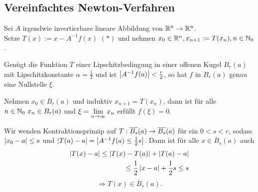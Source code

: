 \documentclass[../ana2.tex]{subfiles}
\begin{document}
\subsection*{Vereinfachtes Newton-Verfahren}
Sei \(A\) irgendwie invertierbare lineare Abbildung von 
\( \mathbb{R}^n \rightarrow \mathbb{R}^n \).\\
Setze \( T(x) := x - A^{-1} f(x) \) \((*)\) 
und nehmen \( x_0 \in \mathbb{R}^n, x_{n+1} := T(x_n), n\in \mathbb{N}_0 \).
\begin{satz}
    Genügt die Funktion \(T\) einer Lipschitzbedingung
    in einer offenen Kugel \( B_r(a) \) mit 
    Lipschitzkonstante \( \alpha = \frac{1}{2} \) 
    und ist \(\left|A^{-1} f(a)\right| < \frac{r}{2}\), so hat \(f\)
    in \(B_r(a)\) genau eine Nullstelle \(\xi\).
\end{satz}
Nehmen \( x_0 \in B_r(a) \) und induktiv 
\( x_{n+1} = T(x_n) \), dann ist für alle \( n \in \mathbb{N}_0 \ x_n \in B_r(a) \) 
und \( \xi = \lim\limits_{n\rightarrow\infty} x_n \) erfüllt \( f(\xi) = 0 \).
\begin{bew}
    Wir wenden Kontraktionsprinzip auf \( T:\overline{B_s}(a)\rightarrow \overline{B_s}(a) \) 
    für ein \( 0 < s < r \), sodass \( \left|x_0 - a\right| \leq s \) 
    und \( \left| T(a) - a \right| = \left| A^{-1} f(a) \leq \frac{1}{2}s \right| \).
    Dann ist für alle \(x \in \overline{B}_s(a)\) auch
    \begin{align*}
        \left|T(x)-a\right| \leq \left|T(x)-T(a)\right| + \left|T(a)-a\right|\\
        \leq \frac{1}{2} \left|x-a\right| + \frac{1}{2}s \leq s
    \end{align*}
    \[ \Rightarrow T(x) \in \overline{B}_s(a). \]
\end{bew}
\end{document}
